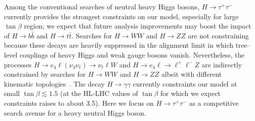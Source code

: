 Among the conventional searches of neutral heavy Higgs bosons, $H \to \tau^+ \tau^-$~\cite{Aaboud:2017sjh} currently provides the strongest constraints on our model, especially for large $\tan\beta$ region; we expect that future analysis improvements may boost the impact of $H \to b \bar b$ and $H \to t \bar t$. Searches for $H \to WW$ and $H\to ZZ$ are not constraining because these decays are heavily suppressed in the alignment limit in which tree--level couplings of heavy Higgs and weak gauge bosons vanish. Nevertheless, the processes $H \to e_4 \ell (\nu_4 \nu_\ell) \to \nu_\ell \ell W$ and $H \to e_4 \ell \to \ell^+ \ell^- Z$ are indirectly constrained by searches for $H \to WW$ and $H\to ZZ$ albeit with different kinematic topologies~\cite{Dermisek:2015vra, Dermisek:2015oja, Dermisek:2015hue}. 
The decay $H \to \gamma \gamma$ currently constraints our model at small $\tan\beta \lesssim 1.5$ (at the HL-LHC values of $\tan\beta$ for which we expect constraints raises to about 3.5).  Here we focus on $H \to \tau^+ \tau^-$ as a competitive search avenue for a heavy neutral Higgs boson. 

